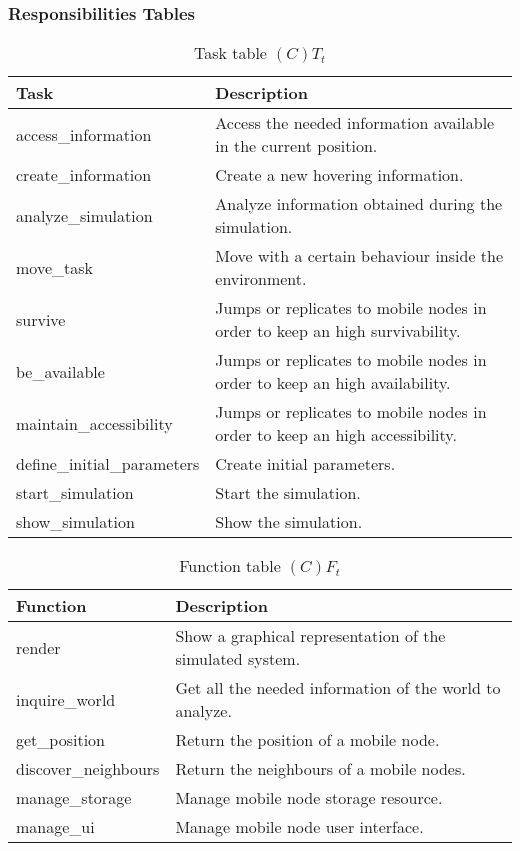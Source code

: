 \subsubsection{Responsibilities Tables}

\begin{table}[H]
	\centering
	\begin{tabular}{|p{5cm}|p{7cm}|}
			\hline
			\textbf{Task} & \textbf{Description} \\
			\hline
			access\_information & Access the needed information available in the
			current position.\\
			\hline
			create\_information & Create a new hovering information. \\
			\hline
			analyze\_simulation & Analyze information obtained during the
			simulation.\\
			\hline
			move\_task & Move with a certain behaviour inside the environment. \\
			\hline
			survive & Jumps or replicates to mobile nodes in order to keep an high
			survivability. \\
			\hline
			be\_available & Jumps or replicates to mobile nodes in order to keep an
			high availability. \\
			\hline
			maintain\_accessibility & Jumps or replicates to mobile nodes in order to
			keep an high accessibility. \\
			\hline
			define\_initial\_parameters & Create initial parameters. \\
			\hline
			start\_simulation & Start the simulation. \\
			\hline
			show\_simulation & Show the simulation. \\
			\hline
		\end{tabular}
	\caption{Task table $(C)T_t$}
	\label{tab:ctt}
\end{table}

\begin{table}[H]
	\centering
	\begin{tabular}{|p{5cm}|p{7cm}|}
			\hline
			\textbf{Function} & \textbf{Description} \\
			\hline
			render & Show a graphical representation of the simulated system. \\
			\hline
			inquire\_world & Get all the needed information of the world to analyze.
			\\
			\hline
			get\_position & Return the position of a mobile node. \\
			\hline
			discover\_neighbours & Return the neighbours of a mobile nodes. \\
			\hline
			manage\_storage & Manage mobile node storage resource. \\
			\hline
			manage\_ui & Manage mobile node user interface. \\
			\hline
		\end{tabular}
	\caption{Function table $(C)F_t$}
	\label{tab:cft}
\end{table}

